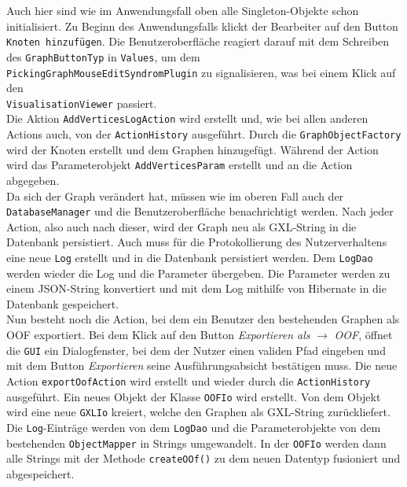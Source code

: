 \documentclass[enabledeprecatedfontcommands,fontsize=11pt,paper=a4,twoside]{scrartcl}
\begin{document}
Auch hier sind wie im Anwendungsfall oben alle Singleton-Objekte schon initialisiert. Zu Beginn des Anwendungsfalls klickt der Bearbeiter auf den Button \texttt{Knoten hinzufügen}. Die Benutzeroberfläche reagiert darauf mit dem Schreiben des \texttt{GraphButtonTyp} in \texttt{Values}, um dem \\\texttt{PickingGraphMouseEditSyndromPlugin} zu signalisieren, was bei einem Klick auf den \\\texttt{VisualisationViewer} passiert.\\
Die Aktion \texttt{AddVerticesLogAction} wird erstellt und, wie bei allen anderen Actions auch, von der \texttt{ActionHistory} ausgeführt. Durch die \texttt{GraphObjectFactory} wird der Knoten erstellt und dem Graphen hinzugefügt. Während der Action wird das Parameterobjekt \texttt{AddVerticesParam} erstellt und an die Action abgegeben.\\  
Da sich der Graph verändert hat, müssen wie im oberen Fall auch der \texttt{DatabaseManager} und die Benutzeroberfläche benachrichtigt werden. Nach jeder Action, also auch nach dieser, wird der Graph neu als GXL-String in die Datenbank persistiert. Auch muss für die Protokollierung des Nutzerverhaltens eine neue \texttt{Log} erstellt und in die Datenbank persistiert werden. Dem \texttt{LogDao} werden wieder die Log und die Parameter übergeben. Die Parameter werden zu einem JSON-String konvertiert und mit dem Log mithilfe von Hibernate in die Datenbank gespeichert.\\
Nun besteht noch die Action, bei dem ein Benutzer den bestehenden Graphen als OOF exportiert. Bei dem Klick auf den Button \textit{Exportieren als} $\rightarrow$ \textit{OOF}, öffnet die \texttt{GUI} ein Dialogfenster, bei dem der Nutzer einen validen Pfad eingeben und mit dem Button \textit{Exportieren} seine Ausführungsabsicht bestätigen muss. Die neue Action \texttt{exportOofAction} wird erstellt und wieder durch die \texttt{ActionHistory} ausgeführt. Ein neues Objekt der Klasse \texttt{OOFIo} wird erstellt. Von dem Objekt wird eine neue \texttt{GXLIo} kreiert, welche den Graphen als GXL-String zurückliefert. Die \texttt{Log}-Einträge werden von dem \texttt{LogDao} und die Parameterobjekte von dem bestehenden \texttt{ObjectMapper} in Strings umgewandelt. In der \texttt{OOFIo} werden dann alle Strings mit der Methode \texttt{createOOf()} zu dem neuen Datentyp fusioniert und abgespeichert.  



\end{document}
